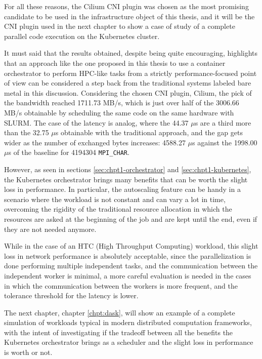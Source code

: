 For all these reasons, the Cilium CNI plugin was chosen as the most promising
candidate to be used in the infrastructure object of this thesis, and it will be
the CNI plugin used in the next chapter to show a case of study of a complete
parallel code execution on the Kubernetes cluster.

It must said that the results obtained, despite being quite encouraging,
highlights that an approach like the one proposed in this thesis to use a
container orchestrator to perform HPC-like tasks from a strictly
performance-focused point of view can be considered a step back from the
traditional systems labeled bare metal in this discussion.
Considering the chosen CNI plugin, Cilium, the pick of the bandwidth reached
1711.73 MB/s, which is just over half of the 3006.66 MB/s obtainable by
scheduling the same code on the same hardware with SLURM.
The case of the latency is analog, where the 44.37 $\mu$s are a third more than
the 32.75 $\mu$s obtainable with the traditional approach, and the gap gets
wider as the number of exchanged bytes increases: 4588.27 $\mu$s against the
1998.00 $\mu$s of the baseline for 4194304 \texttt{MPI\_CHAR}.

However, as seen in sections \ref{sec:chpt1-orchestrator} and
\ref{sec:chpt1-kubernetes}, the Kubernetes orchestrator brings many benefits
that can be worth the slight loss in performance.
In particular, the autoscaling feature can be handy in a scenario where the
workload is not constant and can vary a lot in time, overcoming the rigidity of
the traditional resource allocation in which the resources are asked at the
beginning of the job and are kept until the end, even if they are not needed
anymore.

While in the case of an HTC (High Throughput Computing) workload, this slight
loss in network performance is absolutely acceptable, since the parallelization
is done performing multiple independent tasks, and the communication between the
independent worker is minimal, a more careful evaluation is needed in the cases
in which the communication between the workers is more frequent, and the
tolerance threshold for the latency is lower.

The next chapter, chapter \ref{chpt:dask}, will show an example of a complete
simulation of workloads typical in modern distributed computation frameworks,
with the intent of investigating if the tradeoff between all the benefits the
Kubernetes orchestrator brings as a scheduler and the slight loss in performance
is worth or not.
